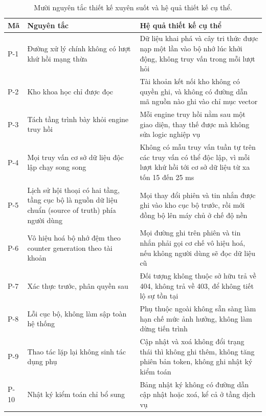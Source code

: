 \begin{table}[htbp]
    \centering
    \caption{Mười nguyên tắc thiết kế xuyên suốt và hệ quả thiết kế cụ thể.}
    \label{tab:muoi-nguyen-tac}
    \small
    \begin{tabularx}{\textwidth}{@{}l>{\raggedright\arraybackslash}p{4.3cm}>{\raggedright\arraybackslash}X@{}}
        \toprule
        \textbf{Mã} & \textbf{Nguyên tắc} & \textbf{Hệ quả thiết kế cụ thể} \\
        \midrule
        P-1 & Đường xử lý chính không có lượt khứ hồi mạng thừa & Dữ liệu khai phá và cây tri thức được nạp một lần vào bộ nhớ lúc khởi động, không truy vấn trong mỗi lượt hỏi \\
        P-2 & Kho khoa học chỉ được đọc & Tài khoản kết nối kho không có quyền ghi, và không có đường dẫn mã nguồn nào ghi vào chỉ mục vector \\
        P-3 & Tách tầng trình bày khỏi engine truy hồi & Mỗi engine truy hồi nằm sau một giao diện, thay thế được mà không sửa logic nghiệp vụ \\
        P-4 & Mọi truy vấn cơ sở dữ liệu độc lập chạy song song & Không có mẫu truy vấn tuần tự trên các truy vấn có thể độc lập, vì mỗi lượt khứ hồi tới cơ sở dữ liệu từ xa tốn 15 đến 25 ms \\
        P-5 & Lịch sử hội thoại có hai tầng, tầng cục bộ là nguồn dữ liệu chuẩn (source of truth) phía người dùng & Mọi thay đổi phiên và tin nhắn được ghi vào kho cục bộ trước, rồi mới đồng bộ lên máy chủ ở chế độ nền \\
        P-6 & Vô hiệu hoá bộ nhớ đệm theo counter generation theo tài khoản & Mọi đường ghi trên phiên và tin nhắn phải gọi cơ chế vô hiệu hoá, nếu không người dùng sẽ đọc dữ liệu cũ \\
        P-7 & Xác thực trước, phân quyền sau & Đối tượng không thuộc sở hữu trả về 404, không trả về 403, để không tiết lộ sự tồn tại \\
        P-8 & Lỗi cục bộ, không làm sập toàn hệ thống & Phụ thuộc ngoài không sẵn sàng làm hạn chế mức ảnh hưởng, không làm dừng tiến trình \\
        P-9 & Thao tác lặp lại không sinh tác dụng phụ & Cập nhật và xoá không đổi trạng thái thì không ghi thêm, không tăng phiên bản token, không ghi nhật ký kiểm toán \\
        P-10 & Nhật ký kiểm toán chỉ bổ sung & Bảng nhật ký không có đường dẫn cập nhật hoặc xoá, kể cả ở tầng dịch vụ \\
        \bottomrule
    \end{tabularx}
\end{table}

